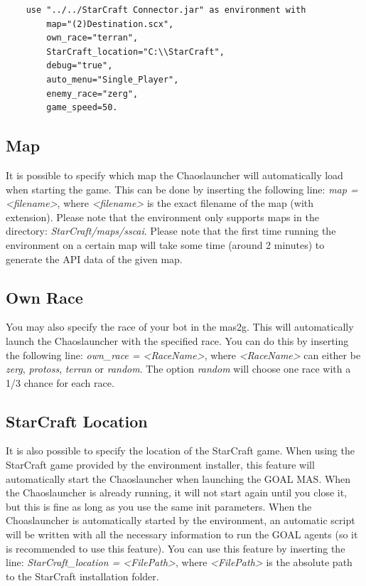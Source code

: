 \begin{verbatim}
    use "../../StarCraft Connector.jar" as environment with
        map="(2)Destination.scx",
        own_race="terran",
        StarCraft_location="C:\\StarCraft",
        debug="true",
        auto_menu="Single_Player",
        enemy_race="zerg",
        game_speed=50.
\end{verbatim}

\subsection{Map}
\label{map}
It is possible to specify which map the Chaoslauncher will automatically load when starting the game. This can be done by inserting the following line: \textit{map = <filename>}, where \textit{<filename>} is the exact filename of the map (with extension). Please note that the environment only supports maps in the directory: \textit{StarCraft/maps/sscai}. Please note that the first time running the environment on a certain map will take some time (around 2 minutes) to generate the API data of the given map.

\subsection{Own Race}
\label{own race}
You may also specify the race of your bot in the mas2g. This will automatically launch the Chaoslauncher with the specified race. You can do this by inserting the following line: \textit{own\_race = <RaceName>}, where \textit{<RaceName>} can either be \textit{zerg}, \textit{protoss}, \textit{terran} or \textit{random}. The option \textit{random} will choose one race with a 1/3 chance for each race.

\subsection{StarCraft Location}
\label{StarCraft location}
It is also possible to specify the location of the StarCraft game. When using the StarCraft game provided by the environment installer, this feature will automatically start the Chaoslauncher when launching the GOAL MAS. When the Chaoslauncher is already running, it will not start again until you close it, but this is fine as long as you use the same init parameters. When the Choaslauncher is automatically started by the environment, an automatic script will be written with all the necessary information to run the GOAL agents (so it is recommended to use this feature). You can use this feature by inserting the line: \textit{StarCraft\_location = <FilePath>}, where \textit{<FilePath>} is the absolute path to the StarCraft installation folder.

